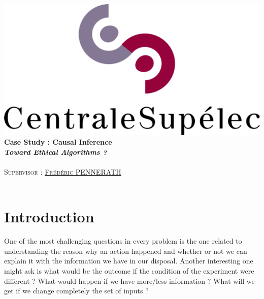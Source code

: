 \documentclass{article}
\author{\Large \textsc{\href{mailto:mohammed.fellaji@supelec.fr}{Mohammed FELLAJI}, \href{mailto:ahmed.benaissa@supelec.fr}{Ahmed BEN AISSA}}}
\date{September, 2020}
\begin{document}
\hypersetup{pdfborder=0 0 0} 		

\makeatletter
  \begin{titlepage}
  \centering
     {\large \textsc{   }}\\
     \vspace{1em}
    \centering
      \includegraphics[width=0.5 \textwidth]{figures/LogoCS.png} \\
    \vspace{4cm}
      {\LARGE\textbf{Case Study : Causal Inference}\\  
       \vspace{1em}
       {\large\textbf{
       \textit{\LARGE{Toward Ethical Algorithms ?}}}}\\  
    \vspace{4cm}
    \centering
     {\Large \@author} \\
     \vspace{1em}
        {\Large \textsc{Supervisor : \href{mailto:frederic.pennerath@centralesupelec.fr}{Frédéric PENNERATH}}}\\
        \vspace{3em}
        {\Large \@date} }\\
  \end{titlepage}
 
 
\makeatother

\tableofcontents




\newpage
\section{Introduction}
One of the most challenging questions in every problem is the one related to understanding the reason why an action happened and whether or not we can explain it with the information we have in our disposal. Another interesting one might ask is what would be the outcome if the condition of the experiment were different ? What would happen if we have more/less information ? What will we get if we change completely the set of inputs ?
\end{document}
